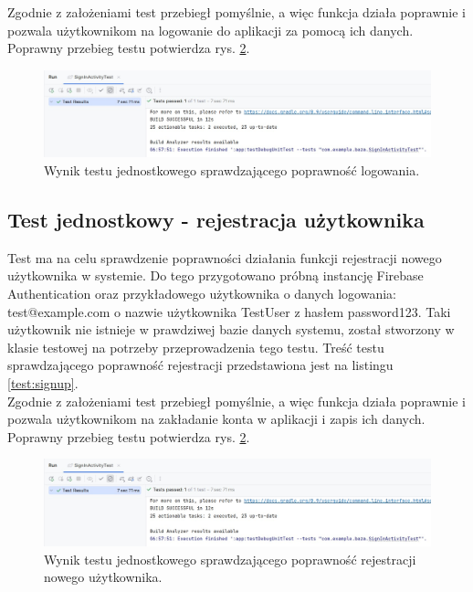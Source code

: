 Zgodnie z założeniami test przebiegł pomyślnie, a więc funkcja działa poprawnie i pozwala użytkownikom na logowanie do aplikacji za pomocą ich danych. Poprawny przebieg testu potwierdza rys. \ref{result:login}. \\
\setlength{\fboxrule}{0.5pt}
\begin{figure}[H]
    \centering
    \includegraphics[scale=0.5]{img/test/login-wynik.jpg}
    \caption{Wynik testu jednostkowego sprawdzającego poprawność logowania.}
    \label{result:login}
\end{figure}

\subsection*{Test jednostkowy - rejestracja użytkownika}
Test ma na celu sprawdzenie poprawności działania funkcji rejestracji nowego użytkownika w systemie. Do tego przygotowano próbną instancję Firebase Authentication oraz przykładowego użytkownika o danych logowania: test@example.com o nazwie użytkownika TestUser z hasłem password123. Taki użytkownik nie istnieje w prawdziwej bazie danych systemu, został stworzony w klasie testowej na potrzeby  przeprowadzenia tego testu. Treść testu sprawdzającego poprawność rejestracji przedstawiona jest na listingu \ref{test:signup}. \\
\indent Zgodnie z założeniami test przebiegł pomyślnie, a więc funkcja działa poprawnie i pozwala użytkownikom na zakładanie konta w aplikacji i zapis ich danych. Poprawny przebieg testu potwierdza rys. \ref{result:login}. \\

\setlength{\fboxrule}{0.5pt}
\begin{figure}[H]
    \centering
    \includegraphics[scale=0.5]{img/test/login-wynik.jpg}
    \caption{Wynik testu jednostkowego sprawdzającego poprawność rejestracji nowego użytkownika.}
    \label{result:login}
\end{figure}


